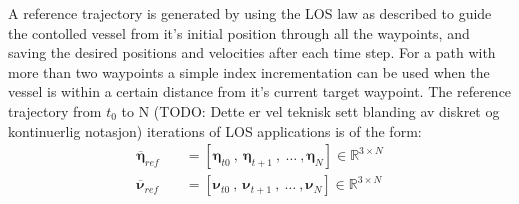 A reference trajectory is generated by using the LOS law as described to guide the contolled vessel from it's initial position through all the waypoints, and
saving the desired positions and velocities after each time step. For a path with more than two waypoints a simple index incrementation can be used when the
vessel is within a certain distance from it's current target waypoint. The reference trajectory from $t_0$ to N (TODO: Dette er vel teknisk sett blanding av diskret og kontinuerlig notasjon) iterations of \gls{LOS} applications is of the form:
\begin{subequations}
    \begin{align}
        \overline{\bm{\eta}}_{ref} \quad & = [\bm{\eta}_{t0} \ , \ \bm{\eta}_{t+1} \ , \ \dots \ , \bm{\eta}_N] \in \mathbb{R}^{3 \times N} \\ 
        \overline{\bm{\nu}}_{ref} \quad & = [\bm{\nu}_{t0} \ , \ \bm{\nu}_{t+1} \ , \ \dots \ , \bm{\nu}_N] \in \mathbb{R}^{3 \times N}
    \end{align}
\end{subequations}


